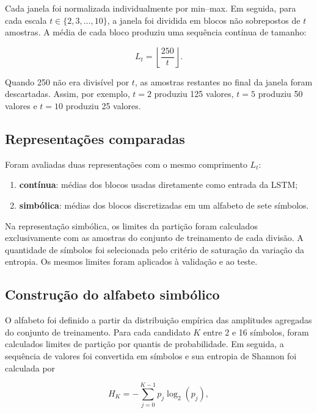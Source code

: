 \documentclass[12pt,a4paper]{article}
\begin{document}
Cada janela foi normalizada individualmente por min--max. Em seguida, para cada escala $t \in \{2,3,\ldots,10\}$, a janela foi dividida em blocos não sobrepostos de $t$ amostras. A média de cada bloco produziu uma sequência contínua de tamanho:

\begin{equation}
L_t = \left\lfloor \frac{250}{t} \right\rfloor.
\end{equation}

Quando 250 não era divisível por $t$, as amostras restantes no final da janela foram descartadas. Assim, por exemplo, $t=2$ produziu 125 valores, $t=5$ produziu 50 valores e $t=10$ produziu 25 valores.

\subsection{Representações comparadas}

Foram avaliadas duas representações com o mesmo comprimento $L_t$:

\begin{enumerate}
    \item \textbf{contínua}: médias dos blocos usadas diretamente como entrada da LSTM;
    \item \textbf{simbólica}: médias dos blocos discretizadas em um alfabeto de sete símbolos.
\end{enumerate}

Na representação simbólica, os limites da partição foram calculados exclusivamente com as amostras do conjunto de treinamento de cada divisão. A quantidade de símbolos foi selecionada pelo critério de saturação da variação da entropia. Os mesmos limites foram aplicados à validação e ao teste.

\subsection{Construção do alfabeto simbólico}

O alfabeto foi definido a partir da distribuição empírica das amplitudes agregadas do conjunto de treinamento. Para cada candidato $K$ entre 2 e 16 símbolos, foram calculados limites de partição por quantis de probabilidade. Em seguida, a sequência de valores foi convertida em símbolos e sua entropia de Shannon foi calculada por

\begin{equation}
H_K=-\sum_{j=0}^{K-1}p_j\log_2(p_j),
\end{equation}
\end{document}
